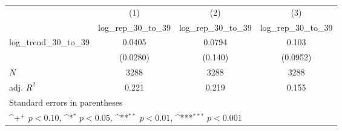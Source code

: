 {
\def\sym#1{\ifmmode^{#1}\else\(^{#1}\)\fi}
\begin{tabular}{l*{3}{c}}
\hline\hline
            &\multicolumn{1}{c}{(1)}&\multicolumn{1}{c}{(2)}&\multicolumn{1}{c}{(3)}\\
            &\multicolumn{1}{c}{log\_rep\_30\_to\_39}&\multicolumn{1}{c}{log\_rep\_30\_to\_39}&\multicolumn{1}{c}{log\_rep\_30\_to\_39}\\
\hline
log\_trend\_30\_to\_39&      0.0405         &      0.0794         &       0.103         \\
            &    (0.0280)         &     (0.140)         &    (0.0952)         \\
\hline
\(N\)       &        3288         &        3288         &        3288         \\
adj. \(R^{2}\)&       0.221         &       0.219         &       0.155         \\
\hline\hline
\multicolumn{4}{l}{\footnotesize Standard errors in parentheses}\\
\multicolumn{4}{l}{\footnotesize \sym{+} \(p<0.10\), \sym{*} \(p<0.05\), \sym{**} \(p<0.01\), \sym{***} \(p<0.001\)}\\
\end{tabular}
}
